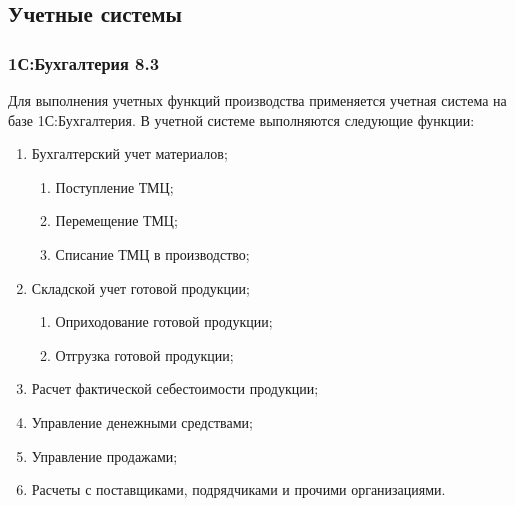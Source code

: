 \subsection{Учетные системы}

\subsubsection{1С:Бухгалтерия 8.3}


Для выполнения учетных функций производства применяется учетная система на
базе 1С:Бухгалтерия. В учетной системе выполняются следующие функции:


\begin{enumerate}
\item Бухгалтерский учет материалов;
\begin{enumerate}
\item Поступление ТМЦ;
\item Перемещение ТМЦ;
\item Списание ТМЦ в производство;
\end{enumerate}
\item Складской учет готовой продукции;
\begin{enumerate}
\item Оприходование готовой продукции;
\item Отгрузка готовой продукции;
\end{enumerate}
\item Расчет фактической себестоимости продукции;
\item Управление денежными средствами;
\item Управление продажами;
\item Расчеты с поставщиками, подрядчиками и прочими организациями.


\end{enumerate}
